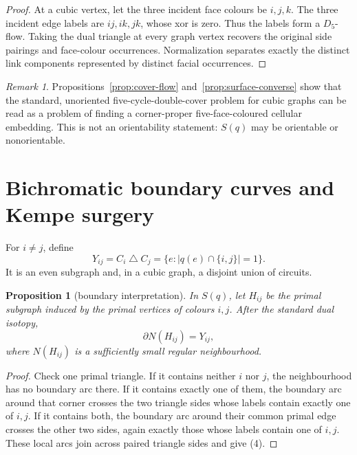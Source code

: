\documentclass[11pt]{article}
\newtheorem{proposition}[theorem]{Proposition}
\theoremstyle{definition}
\theoremstyle{remark}
\newtheorem{remark}[theorem]{Remark}
\newcommand{\symdiff}{\mathbin{\triangle}}
\begin{document}
\begin{proof}
At a cubic vertex, let the three incident face colours be \(i,j,k\).  The
three incident edge labels are \(ij,ik,jk\), whose xor is zero.  Thus the
labels form a \(D_5\)-flow.  Taking the dual triangle at every graph vertex
recovers the original side pairings and face-colour occurrences.
Normalization separates exactly the distinct link components represented
by distinct facial occurrences.
\end{proof}

\begin{remark}
Propositions~\ref{prop:cover-flow} and~\ref{prop:surface-converse} show
that the standard, unoriented five-cycle-double-cover problem for cubic
graphs can be read as a problem of finding a corner-proper
five-face-coloured cellular embedding.  This is not an orientability
statement: \(S(q)\) may be orientable or nonorientable.
\end{remark}

\section{Bichromatic boundary curves and Kempe surgery}

For \(i\ne j\), define
\[
 Y_{ij}=C_i\symdiff C_j
       =\{e:|q(e)\cap\{i,j\}|=1\}.                            \tag{3}
\]
It is an even subgraph and, in a cubic graph, a disjoint union of
circuits.

\begin{proposition}[boundary interpretation]\label{prop:boundary}
In \(S(q)\), let \(H_{ij}\) be the primal subgraph induced by the primal
vertices of colours \(i,j\).  After the standard dual isotopy,
\[
 \partial N(H_{ij})=Y_{ij},                                  \tag{4}
\]
where \(N(H_{ij})\) is a sufficiently small regular neighbourhood.
\end{proposition}

\begin{proof}
Check one primal triangle.  If it contains neither \(i\) nor \(j\), the
neighbourhood has no boundary arc there.  If it contains exactly one of
them, the boundary arc around that corner crosses the two triangle sides
whose labels contain exactly one of \(i,j\).  If it contains both, the
boundary arc around their common primal edge crosses the other two sides,
again exactly those whose labels contain one of \(i,j\).  These local arcs
join across paired triangle sides and give (4).
\end{proof}
\end{document}
